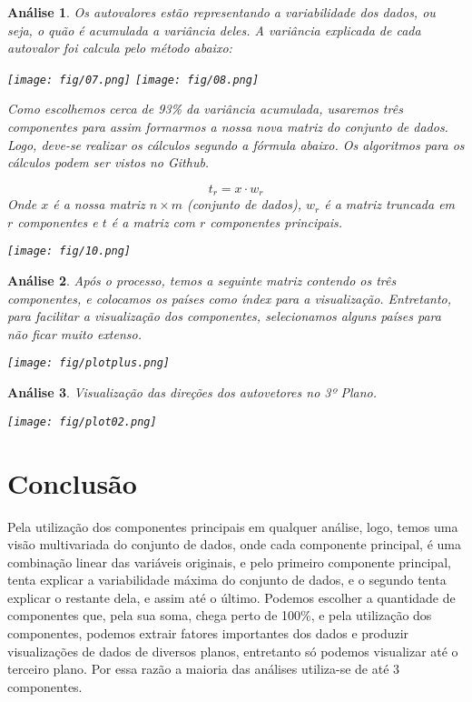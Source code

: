 \documentclass[11pt,a4paper]{article}
\newtheorem{2}{Análise}
\begin{document}
\begin{2} \normalfont
Os autovalores estão representando a variabilidade dos dados, ou seja, o quão é acumulada a variância deles. A variância explicada de cada autovalor foi calcula pelo método abaixo:

\begin{center}
    \texttt{[image: fig/07.png]}
    \texttt{[image: fig/08.png]}
\end{center}

Como escolhemos cerca de 93\% da variância acumulada, usaremos três componentes para assim formarmos a nossa nova matriz do conjunto de dados. Logo, deve-se realizar os cálculos segundo a fórmula abaixo. Os algoritmos para os cálculos podem ser vistos no Github.

$$t_r = x \cdot w_r$$
\hspace{0.6cm}Onde $x$ é a nossa matriz $n \times m$ (conjunto de dados), $w_r$ é a matriz truncada em $r$ componentes e $t$ é a matriz com $r$ componentes principais.

\begin{center}
    \texttt{[image: fig/10.png]}
\end{center}
\end{2}

\begin{2} \normalfont Após o processo, temos a seguinte matriz contendo os três componentes, e colocamos os países como índex para a visualização. Entretanto, para facilitar a visualização dos componentes, selecionamos alguns países para não ficar muito extenso.

\begin{center}
    \texttt{[image: fig/plotplus.png]}
\end{center}
\end{2}

\begin{2} \normalfont Visualização das direções dos autovetores no 3º Plano.

\begin{center}
    \texttt{[image: fig/plot02.png]}
\end{center}
\end{2}

\section{Conclusão}

\hspace{0.6cm}Pela utilização dos componentes principais em qualquer análise, logo, temos uma visão multivariada do conjunto de dados, onde cada componente principal, é uma combinação linear das variáveis originais, e pelo primeiro componente principal, tenta explicar a variabilidade máxima do conjunto de dados, e o segundo tenta explicar o restante dela, e assim até o último. Podemos escolher a quantidade de componentes que, pela sua soma, chega perto de 100\%, e pela utilização dos componentes, podemos extrair fatores importantes dos dados e produzir visualizações de dados de diversos planos, entretanto só podemos visualizar até o terceiro plano. Por essa razão a maioria das análises utiliza-se de até 3 componentes.
\end{document}
